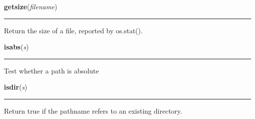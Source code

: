     \label{genericpath:getsize}

    \vspace{0.5ex}

\hspace{.8\funcindent}\begin{boxedminipage}{\funcwidth}

    \raggedright \textbf{getsize}(\textit{filename})

    \vspace{-1.5ex}

    \rule{\textwidth}{0.5\fboxrule}
\setlength{\parskip}{2ex}
    Return the size of a file, reported by os.stat().

\setlength{\parskip}{1ex}
    \end{boxedminipage}

    \label{posixpath:isabs}

    \vspace{0.5ex}

\hspace{.8\funcindent}\begin{boxedminipage}{\funcwidth}

    \raggedright \textbf{isabs}(\textit{s})

    \vspace{-1.5ex}

    \rule{\textwidth}{0.5\fboxrule}
\setlength{\parskip}{2ex}
    Test whether a path is absolute

\setlength{\parskip}{1ex}
    \end{boxedminipage}

    \label{genericpath:isdir}

    \vspace{0.5ex}

\hspace{.8\funcindent}\begin{boxedminipage}{\funcwidth}

    \raggedright \textbf{isdir}(\textit{s})

    \vspace{-1.5ex}

    \rule{\textwidth}{0.5\fboxrule}
\setlength{\parskip}{2ex}
    Return true if the pathname refers to an existing directory.

\setlength{\parskip}{1ex}
    \end{boxedminipage}

